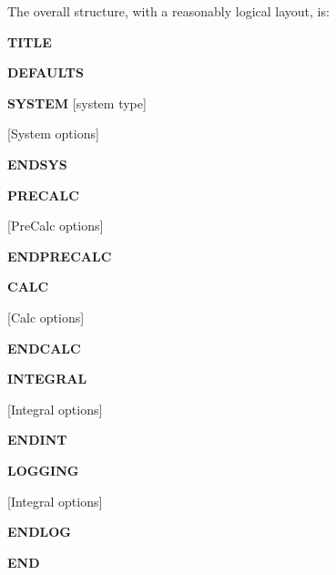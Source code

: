 \documentclass[openany,a4paper,10pt]{manual}
\begin{document}
The overall structure, with a reasonably logical layout, is:

\textbf{TITLE}

\textbf{DEFAULTS}

\textbf{SYSTEM} {[}system type{]}

{[}System options{]}

\textbf{ENDSYS}

\textbf{PRECALC}

{[}PreCalc options{]}

\textbf{ENDPRECALC}

\textbf{CALC}

{[}Calc options{]}

\textbf{ENDCALC}

\textbf{INTEGRAL}

{[}Integral options{]}

\textbf{ENDINT}

\textbf{LOGGING}

{[}Integral options{]}

\textbf{ENDLOG}

\textbf{END}
\end{document}
